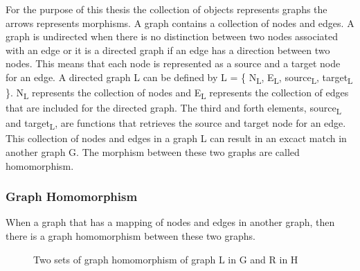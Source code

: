 For the purpose of this thesis the collection of objects represents graphs the
arrows represents morphisms. A graph contains a collection of nodes and edges.
A graph is undirected when there is no distinction between two nodes associated
with an edge or it is a directed graph if an edge has a direction between two
nodes. This means that each node is represented as a source and a target node
for an edge. A directed graph L can be defined by L = \{
N\textsubscript{L}, E\textsubscript{L}, source\textsubscript{L},
target\textsubscript{L} \}. N\textsubscript{L} represents the collection of
nodes and E\textsubscript{L} represents the collection of edges that are
included for the directed graph. The third and forth elements,
source\textsubscript{L} and target\textsubscript{L}, are functions that
retrieves the source and target node for an edge. This collection of nodes and
edges in a graph L can result in an excact match in another graph G. The
morphism between these two graphs are called homomorphism.

\subsubsection*{Graph Homomorphism}

When a graph that has a mapping of nodes and edges in another graph, then there
is a graph homomorphism between these two graphs.

\begin{figure}[H]
	\centering
	\caption[Basic concepts of graph homomorphism]
	{Two sets of graph homomorphism of graph L in G and R in H}
	\label{fig:graphHomomorphism}
\end{figure}

